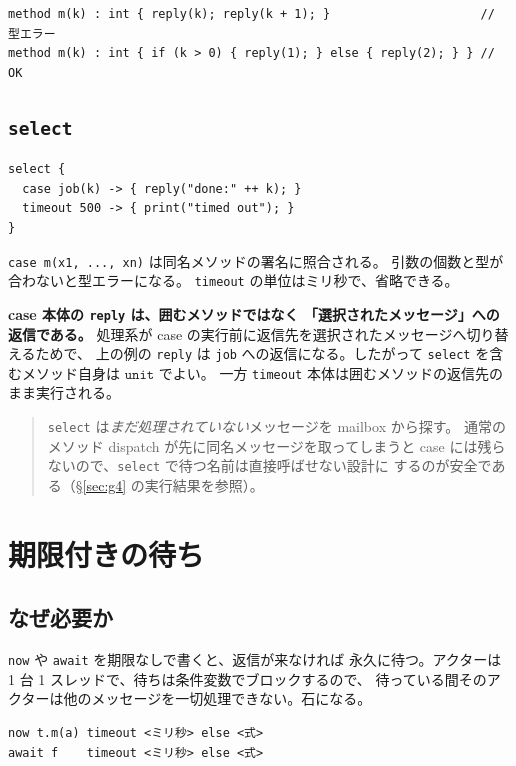 \documentclass[11pt,a4paper]{ltjsarticle}
\newcommand{\ty}[1]{\ensuremath{\mathtt{#1}}}
\begin{document}
\begin{lstlisting}
method m(k) : int { reply(k); reply(k + 1); }                     // 型エラー
method m(k) : int { if (k > 0) { reply(1); } else { reply(2); } } // OK
\end{lstlisting}

\subsection{\texttt{select}}

\begin{lstlisting}
select {
  case job(k) -> { reply("done:" ++ k); }
  timeout 500 -> { print("timed out"); }
}
\end{lstlisting}

\texttt{case m(x1, ..., xn)} は同名メソッドの署名に照合される。
引数の個数と型が合わないと型エラーになる。
\texttt{timeout} の単位はミリ秒で、省略できる。

\textbf{case 本体の \texttt{reply} は、囲むメソッドではなく
「選択されたメッセージ」への返信である。}
処理系が case の実行前に返信先を選択されたメッセージへ切り替えるためで、
上の例の \texttt{reply} は \texttt{job} への返信になる。したがって
\texttt{select} を含むメソッド自身は \ty{unit} でよい。
一方 \texttt{timeout} 本体は囲むメソッドの返信先のまま実行される。

\begin{quote}\small
\texttt{select} は\emph{まだ処理されていない}メッセージを mailbox から探す。
通常のメソッド dispatch が先に同名メッセージを取ってしまうと
case には残らないので、\texttt{select} で待つ名前は直接呼ばせない設計に
するのが安全である（\S\ref{sec:g4} の実行結果を参照）。
\end{quote}

\section{期限付きの待ち}
\label{sec:deadline}

\subsection{なぜ必要か}

\texttt{now} や \texttt{await} を期限なしで書くと、返信が来なければ
永久に待つ。アクターは 1 台 1 スレッドで、待ちは条件変数でブロックするので、
待っている間そのアクターは他のメッセージを一切処理できない。石になる。

\begin{lstlisting}
now t.m(a) timeout <ミリ秒> else <式>
await f    timeout <ミリ秒> else <式>
\end{lstlisting}
\end{document}
